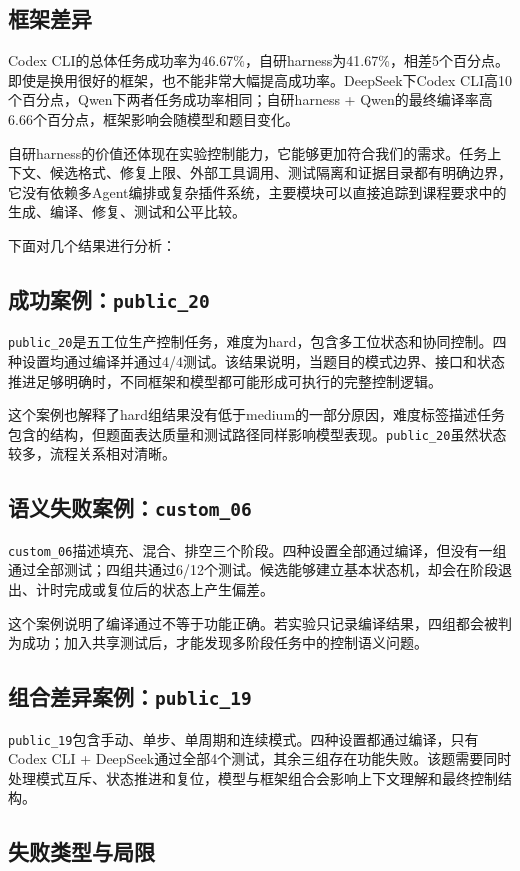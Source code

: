 \documentclass[UTF8,a4paper,zihao=-4]{ctexart}
\begin{document}
\subsection{框架差异}
Codex CLI的总体任务成功率为46.67\%，自研harness为41.67\%，相差5个百分点。即使是换用很好的框架，也不能非常大幅提高成功率。DeepSeek下Codex CLI高10个百分点，Qwen下两者任务成功率相同；自研harness + Qwen的最终编译率高6.66个百分点，框架影响会随模型和题目变化。

自研harness的价值还体现在实验控制能力，它能够更加符合我们的需求。任务上下文、候选格式、修复上限、外部工具调用、测试隔离和证据目录都有明确边界，它没有依赖多Agent编排或复杂插件系统，主要模块可以直接追踪到课程要求中的生成、编译、修复、测试和公平比较。

下面对几个结果进行分析：

\subsection{成功案例：\texttt{public\_20}}
\texttt{public\_20}是五工位生产控制任务，难度为hard，包含多工位状态和协同控制。四种设置均通过编译并通过4/4测试。该结果说明，当题目的模式边界、接口和状态推进足够明确时，不同框架和模型都可能形成可执行的完整控制逻辑。

这个案例也解释了hard组结果没有低于medium的一部分原因，难度标签描述任务包含的结构，但题面表达质量和测试路径同样影响模型表现。\texttt{public\_20}虽然状态较多，流程关系相对清晰。

\subsection{语义失败案例：\texttt{custom\_06}}
\texttt{custom\_06}描述填充、混合、排空三个阶段。四种设置全部通过编译，但没有一组通过全部测试；四组共通过6/12个测试。候选能够建立基本状态机，却会在阶段退出、计时完成或复位后的状态上产生偏差。

这个案例说明了编译通过不等于功能正确。若实验只记录编译结果，四组都会被判为成功；加入共享测试后，才能发现多阶段任务中的控制语义问题。

\subsection{组合差异案例：\texttt{public\_19}}
\texttt{public\_19}包含手动、单步、单周期和连续模式。四种设置都通过编译，只有Codex CLI + DeepSeek通过全部4个测试，其余三组存在功能失败。该题需要同时处理模式互斥、状态推进和复位，模型与框架组合会影响上下文理解和最终控制结构。

\subsection{失败类型与局限}
\end{document}
